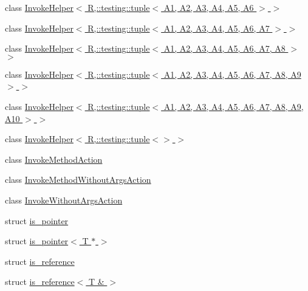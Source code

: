 \begin{DoxyCompactItemize}
\item 
class \hyperlink{classtesting_1_1internal_1_1InvokeHelper_3_01R_00_1_1testing_1_1tuple_3_01A1_00_01A2_00_01A3_00_01A4_00_01A5_00_01A6_01_4_01_4}{Invoke\+Helper$<$ R,\+::testing\+::tuple$<$ A1, A2, A3, A4, A5, A6 $>$ $>$}
\item 
class \hyperlink{classtesting_1_1internal_1_1InvokeHelper_3_01R_00_1_1testing_1_1tuple_3_01A1_00_01A2_00_01A3_00_b7816aa3474ddb9fa0fd012d718c7441}{Invoke\+Helper$<$ R,\+::testing\+::tuple$<$ A1, A2, A3, A4, A5, A6, A7 $>$ $>$}
\item 
class \hyperlink{classtesting_1_1internal_1_1InvokeHelper_3_01R_00_1_1testing_1_1tuple_3_01A1_00_01A2_00_01A3_00_c3256b948e767f440ca72203dbf5e97c}{Invoke\+Helper$<$ R,\+::testing\+::tuple$<$ A1, A2, A3, A4, A5, A6, A7, A8 $>$ $>$}
\item 
class \hyperlink{classtesting_1_1internal_1_1InvokeHelper_3_01R_00_1_1testing_1_1tuple_3_01A1_00_01A2_00_01A3_00_84580538a045b2e1759bc29528d8207c}{Invoke\+Helper$<$ R,\+::testing\+::tuple$<$ A1, A2, A3, A4, A5, A6, A7, A8, A9 $>$ $>$}
\item 
class \hyperlink{classtesting_1_1internal_1_1InvokeHelper_3_01R_00_1_1testing_1_1tuple_3_01A1_00_01A2_00_01A3_00_4b05aa1103fc4c073e11060d6839ad21}{Invoke\+Helper$<$ R,\+::testing\+::tuple$<$ A1, A2, A3, A4, A5, A6, A7, A8, A9, A10 $>$ $>$}
\item 
class \hyperlink{classtesting_1_1internal_1_1InvokeHelper_3_01R_00_1_1testing_1_1tuple_3_4_01_4}{Invoke\+Helper$<$ R,\+::testing\+::tuple$<$$>$ $>$}
\item 
class \hyperlink{classtesting_1_1internal_1_1InvokeMethodAction}{Invoke\+Method\+Action}
\item 
class \hyperlink{classtesting_1_1internal_1_1InvokeMethodWithoutArgsAction}{Invoke\+Method\+Without\+Args\+Action}
\item 
class \hyperlink{classtesting_1_1internal_1_1InvokeWithoutArgsAction}{Invoke\+Without\+Args\+Action}
\item 
struct \hyperlink{structtesting_1_1internal_1_1is__pointer}{is\+\_\+pointer}
\item 
struct \hyperlink{structtesting_1_1internal_1_1is__pointer_3_01T_01_5_01_4}{is\+\_\+pointer$<$ T $\ast$ $>$}
\item 
struct \hyperlink{structtesting_1_1internal_1_1is__reference}{is\+\_\+reference}
\item 
struct \hyperlink{structtesting_1_1internal_1_1is__reference_3_01T_01_6_01_4}{is\+\_\+reference$<$ T \& $>$}
\item 

\end{DoxyCompactItemize}
